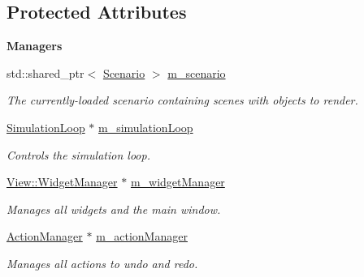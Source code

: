 \subsection*{Protected Attributes}
\begin{Indent}\textbf{ Managers}\par
\begin{DoxyCompactItemize}
\item 
\mbox{\label{classrev_1_1_core_engine_ae8aeba81001c56f936eef1bd29133f9e}} 
std\+::shared\+\_\+ptr$<$ \mbox{\hyperlink{classrev_1_1_scenario}{Scenario}} $>$ \mbox{\hyperlink{classrev_1_1_core_engine_ae8aeba81001c56f936eef1bd29133f9e}{m\+\_\+scenario}}
\begin{DoxyCompactList}\small\item\em The currently-\/loaded scenario containing scenes with objects to render. \end{DoxyCompactList}\item 
\mbox{\label{classrev_1_1_core_engine_aec422a298f79872e6f7718a3a0437dab}} 
\mbox{\hyperlink{classrev_1_1_simulation_loop}{Simulation\+Loop}} $\ast$ \mbox{\hyperlink{classrev_1_1_core_engine_aec422a298f79872e6f7718a3a0437dab}{m\+\_\+simulation\+Loop}}
\begin{DoxyCompactList}\small\item\em Controls the simulation loop. \end{DoxyCompactList}\item 
\mbox{\label{classrev_1_1_core_engine_a0e328afa2710f7517c899dee793c672e}} 
\mbox{\hyperlink{classrev_1_1_view_1_1_widget_manager}{View\+::\+Widget\+Manager}} $\ast$ \mbox{\hyperlink{classrev_1_1_core_engine_a0e328afa2710f7517c899dee793c672e}{m\+\_\+widget\+Manager}}
\begin{DoxyCompactList}\small\item\em Manages all widgets and the main window. \end{DoxyCompactList}\item 
\mbox{\label{classrev_1_1_core_engine_a102e8ef5e828d18dd2da6209b599f8d5}} 
\mbox{\hyperlink{classrev_1_1_action_manager}{Action\+Manager}} $\ast$ \mbox{\hyperlink{classrev_1_1_core_engine_a102e8ef5e828d18dd2da6209b599f8d5}{m\+\_\+action\+Manager}}
\begin{DoxyCompactList}\small\item\em Manages all actions to undo and redo. \end{DoxyCompactList}\item 

\end{DoxyCompactItemize}
\end{Indent}
